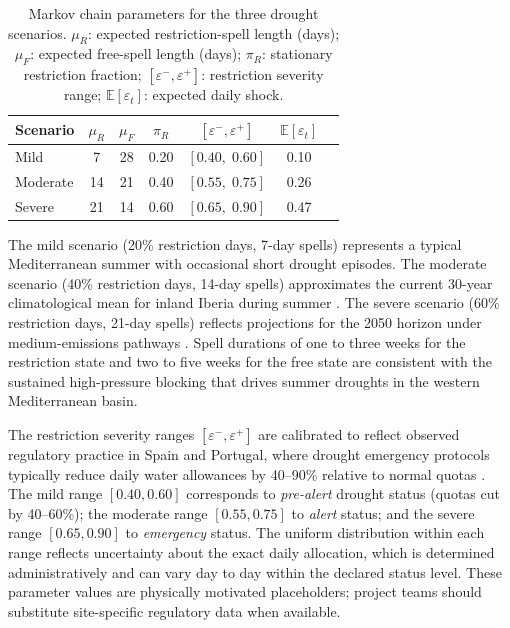 \documentclass[12pt,a4paper]{article}
\newcommand{\eps}{\varepsilon}
\begin{document}
\begin{table}[h]
\caption{Markov chain parameters for the three drought scenarios.
$\mu_R$: expected restriction-spell length (days);
$\mu_F$: expected free-spell length (days);
$\pi_R$: stationary restriction fraction;
$[\eps^-,\eps^+]$: restriction severity range;
$\mathbb{E}[\eps_t]$: expected daily shock.}
\label{tab:scenarios}
\centering
\begin{tabular}{lcccccc}
\toprule
Scenario & $\mu_R$ & $\mu_F$ & $\pi_R$ & $[\eps^-,\eps^+]$ &
$\mathbb{E}[\eps_t]$ \\
\midrule
Mild     &  7 & 28 & 0.20 & $[0.40,\;0.60]$ & 0.10 \\
Moderate & 14 & 21 & 0.40 & $[0.55,\;0.75]$ & 0.26 \\
Severe   & 21 & 14 & 0.60 & $[0.65,\;0.90]$ & 0.47 \\
\bottomrule
\end{tabular}
\end{table}

The mild scenario (20\% restriction days, 7-day spells) represents a typical
Mediterranean summer with occasional short drought episodes.  The moderate scenario
(40\% restriction days, 14-day spells) approximates the current 30-year climatological
mean for inland Iberia during summer \citep{IPCC2021}.  The severe scenario
(60\% restriction days, 21-day spells) reflects projections for the 2050 horizon
under medium-emissions pathways \citep{IPCC2021}.  Spell durations of one to three
weeks for the restriction state and two to five weeks for the free state are
consistent with the sustained high-pressure blocking that drives summer droughts
in the western Mediterranean basin.

The restriction severity ranges $[\eps^-, \eps^+]$ are calibrated to reflect
observed regulatory practice in Spain and Portugal, where drought emergency
protocols typically reduce daily water allowances by 40--90\% relative to normal
quotas \citep{Scanlon2023}.  The mild range $[0.40, 0.60]$ corresponds to
\emph{pre-alert} drought status (quotas cut by 40--60\%); the moderate range
$[0.55, 0.75]$ to \emph{alert} status; and the severe range $[0.65, 0.90]$ to
\emph{emergency} status.  The uniform distribution within each range reflects
uncertainty about the exact daily allocation, which is determined administratively
and can vary day to day within the declared status level.  These parameter values
are physically motivated placeholders; project teams should substitute
site-specific regulatory data when available.
\end{document}
